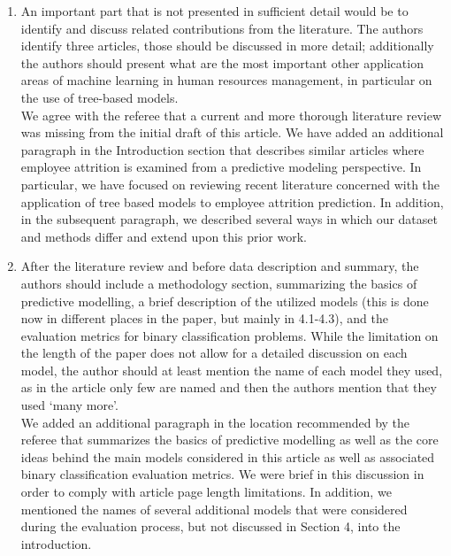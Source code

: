 \documentclass{amsart}[12pt]
\begin{document}
\begin{enumerate}
    \item   {\color{blue} 
        An important part that is not presented in sufficient detail would be to identify and discuss related contributions from the literature. The authors identify three articles, those should be discussed in more detail; additionally the authors should present what are the most important other application areas of machine learning in human resources management, in particular on the use of tree-based models. 
        }\\

We agree with the referee that a current and more thorough literature review was missing from the 
initial draft of this article.  We have added an additional paragraph in the Introduction section 
that describes similar articles where employee attrition is examined from a predictive modeling 
perspective. In particular, we have focused on reviewing recent literature concerned with the 
        application of tree based models to employee attrition prediction.
        In addition, in the subsequent paragraph, we described several ways in which 
our dataset and methods differ and extend upon this prior work. 

        \hspace{10pt}
    \item   {\color{blue} 
        After the literature review and before data description and summary, the authors should include a methodology section, summarizing the basics of predictive modelling, a brief description of the utilized models (this is done now in different places in the paper, but mainly in 4.1-4.3), and the evaluation metrics for binary classification problems. While the limitation on the length of the paper does not allow for a detailed discussion on each model, the author should at least mention the name of each model they used, as in the article only few are named and then the authors mention that they used ‘many more’.
        }\\

        We added an additional paragraph in the location recommended by the referee that summarizes the basics of 
        predictive modelling as well as the core ideas behind the main models considered in this article 
        as well as associated binary classification evaluation metrics.  We were brief in this discussion in 
        order to comply with article page length limitations.  In addition, we mentioned the names of several 
        additional models that were considered during the evaluation process, but not discussed in Section
        4, into the introduction.


\end{enumerate}
\end{document}
